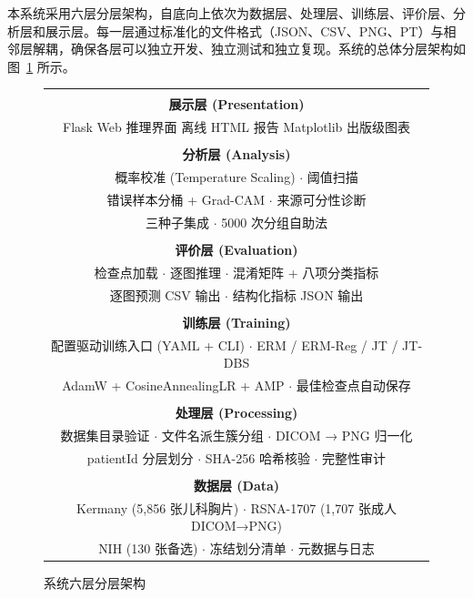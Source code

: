 \documentclass[12pt,a4paper,UTF8,openany]{ctexbook}
\begin{document}
本系统采用六层分层架构，自底向上依次为数据层、处理层、训练层、评价层、分析层和展示层。每一层通过标准化的文件格式（JSON、CSV、PNG、PT）与相邻层解耦，确保各层可以独立开发、独立测试和独立复现。系统的总体分层架构如图~\ref{fig:architecture} 所示。

\begin{figure}[H]
\centering
\begin{tabular}{|c|}
\hline
\\[-1.2em]
\textbf{展示层 (Presentation)} \\
Flask Web 推理界面 \quad 离线 HTML 报告 \quad Matplotlib 出版级图表 \\
\hline
\\[-1.2em]
\textbf{分析层 (Analysis)} \\
概率校准 (Temperature Scaling) $\cdot$ 阈值扫描 \\
错误样本分桶 + Grad-CAM $\cdot$ 来源可分性诊断 \\
三种子集成 $\cdot$ 5000 次分组自助法 \\
\hline
\\[-1.2em]
\textbf{评价层 (Evaluation)} \\
检查点加载 $\cdot$ 逐图推理 $\cdot$ 混淆矩阵 + 八项分类指标 \\
逐图预测 CSV 输出 $\cdot$ 结构化指标 JSON 输出 \\
\hline
\\[-1.2em]
\textbf{训练层 (Training)} \\
配置驱动训练入口 (YAML + CLI) $\cdot$ ERM / ERM-Reg / JT / JT-DBS \\
AdamW + CosineAnnealingLR + AMP $\cdot$ 最佳检查点自动保存 \\
\hline
\\[-1.2em]
\textbf{处理层 (Processing)} \\
数据集目录验证 $\cdot$ 文件名派生簇分组 $\cdot$ DICOM → PNG 归一化 \\
patientId 分层划分 $\cdot$ SHA-256 哈希核验 $\cdot$ 完整性审计 \\
\hline
\\[-1.2em]
\textbf{数据层 (Data)} \\
Kermany (5,856 张儿科胸片) $\cdot$ RSNA-1707 (1,707 张成人 DICOM→PNG) \\
NIH (130 张备选) $\cdot$ 冻结划分清单 $\cdot$ 元数据与日志 \\
\hline
\end{tabular}
\caption{系统六层分层架构}
\label{fig:architecture}
\end{figure}
\end{document}
